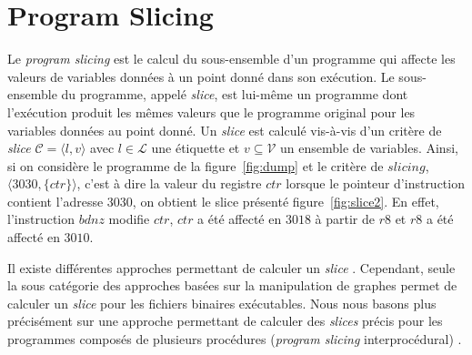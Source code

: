 \section{Program Slicing}
\label{sec:slicing}    


    Le \emph{program slicing} \cite{Wei81} est le calcul du sous-ensemble d'un
    programme qui affecte les valeurs de variables données à un point donné
    dans son exécution. Le sous-ensemble du programme, appelé {\em slice}, est
    lui-même un programme dont l'exécution produit les mêmes valeurs que le
    programme original pour les variables données au point donné. 
    Un \emph{slice} est calculé vis-à-vis d'un critère de \emph{slice}
    $\mathcal{C} = \langle l, v \rangle$ avec $l \in \mathcal{L}$ une étiquette
    et $v \subseteq \mathcal{V}$ un ensemble de variables. Ainsi, si on
    considère le programme de la figure~\ref{fig:dump} et le critère de $slicing$, $\langle 3030,
    \{ctr \}\rangle$, c'est à dire la valeur du registre $ctr$ %
    lorsque le pointeur d'instruction contient
    l'adresse $3030$, on obtient le slice présenté figure~\ref{fig:slice2}. En effet, l'instruction $bdnz$ modifie $ctr$, $ctr$ a été affecté en $3018$ à partir de $r8$ et $r8$ a été affecté en $3010$.
    
    Il existe différentes approches permettant de calculer un \emph{slice}
    \cite{Tip95}.  Cependant, seule la sous catégorie des approches basées sur
    la manipulation de graphes permet de calculer un \emph{slice} pour les
    fichiers binaires exécutables. Nous nous basons plus précisément sur une
    approche permettant de calculer des \emph{slices} précis pour les
    programmes composés de plusieurs procédures (\emph{program slicing}
    interprocédural) \cite{KJL03}.


